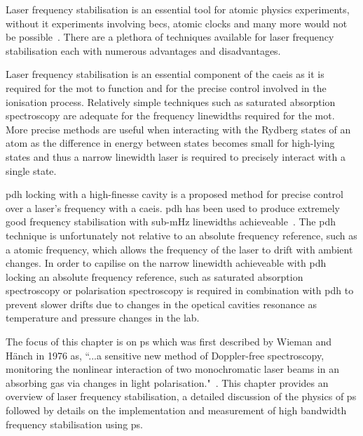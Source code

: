 
Laser frequency stabilisation is an essential tool for atomic physics experiments, without it experiments involving \glspl{bec}, atomic clocks and many more would not be possible~\cite{anderson_observation_1995,ye_quantum_2008}.
There are a plethora of techniques available for laser frequency stabilisation each with numerous advantages and disadvantages.

Laser frequency stabilisation is an essential component of the \gls{caeis} as it is required for the \gls{mot} to function and for the precise control involved in the ionisation process.
Relatively simple techniques such as saturated absorption spectroscopy are adequate for the frequency linewidths required for the \gls{mot}.
More precise methods are useful when interacting with the Rydberg states of an atom as the difference in energy between states becomes small for high-lying states and thus a narrow linewidth laser is required to precisely interact with a single state.

\Gls{pdh} locking with a high-finesse cavity is a proposed method for precise control over a laser's frequency with a \gls{caeis}.
\Gls{pdh} has been used to produce extremely good frequency stabilisation with sub-\unit[40]{mHz} linewidths achieveable~\cite{kessler_sub-40-mhz-linewidth_2012}.
The \gls{pdh} technique is unfortunately not relative to an absolute frequency reference, such as a atomic frequency, which allows the frequency of the laser to drift with ambient changes.
In order to capilise on the narrow linewidth achieveable with \gls{pdh} locking an absolute frequency reference, such as saturated absorption spectroscopy or polarisation spectroscopy is required in combination with \gls{pdh} to prevent slower drifts due to changes in the opetical cavities resonance as temperature and pressure changes in the lab.

The focus of this chapter is on \gls{ps} which was first described by Wieman and H\"anch in 1976 as, ``...a sensitive new method of Doppler-free spectroscopy, monitoring the nonlinear interaction of two monochromatic laser beams in an absorbing gas via changes in light polarisation."~\cite{wieman_doppler-free_1976,demtroder_laser_2003}.
This chapter provides an overview of laser frequency stabilisation, a detailed discussion of the physics of \gls{ps} followed by details on the implementation and measurement of high bandwidth frequency stabilisation using \gls{ps}.

